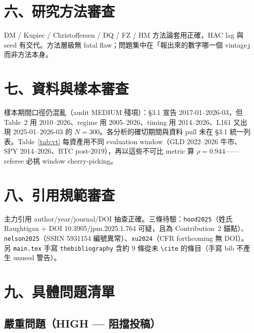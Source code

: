 \documentclass[11pt,a4paper]{article}
\begin{document}
\section{六、研究方法審查}

DM / Kupiec / Christoffersen / DQ / FZ / HM 方法論套用正確，HAC lag 與 seed 有交代。方法層級無 fatal flaw；問題集中在「報出來的數字哪一個 vintage」而非方法本身。

\section{七、資料與樣本審查}

樣本期間口徑仍混亂（audit MEDIUM 殘項）：§3.1 宣告 2017-01--2026-03，但 Table~2 用 2010--2026、regime 用 2005--2026、timing 用 2014--2026、L161 又出現 2025-01--2026-03 的 $N=300$。各分析的確切期間與資料 pull 未在 §3.1 統一列表。Table~\ref{tab:vt} 每資產用不同 evaluation window（GLD 2022--2026 牛市、SPY 2014--2026、BTC post-2019），再以這些不可比 metric 算 $\rho=0.944$——referee 必挑 window cherry-picking。

\section*{} %

\section{八、引用規範審查}

主力引用 author/year/journal/DOI 抽查正確。三條待驗：\texttt{hood2025}（姓氏 Raughtigan + DOI 10.3905/jpm.2025.1.764 可疑，且為 Contribution~2 錨點）、\texttt{nelson2025}（SSRN 5931154 編號異常）、\texttt{xu2024}（CFR forthcoming 無 DOI）。另 \texttt{main.tex} 手寫 \texttt{thebibliography} 含約 9 條從未 \texttt{\textbackslash cite} 的條目（手寫 bib 不產生 unused 警告）。

\section{九、具體問題清單}

\subsection*{\textcolor{errorred}{嚴重問題（HIGH — 阻擋投稿）}}
\end{document}
